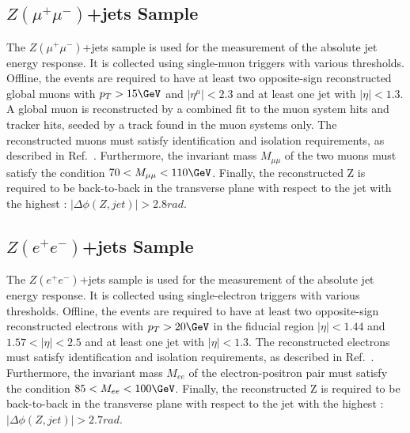 \subsection{$Z(\mu^+\mu^-)$+jets Sample}

The $Z(\mu^+\mu^-)$+jets sample is used for the measurement of the absolute jet energy response. It is collected using single-muon triggers with various \pt thresholds. Offline, the events are required to have at least two opposite-sign reconstructed global muons with $\pt>15\GeV$ and $|\eta^\mu|<2.3$ and at least one jet with $|\eta|<1.3$. A global muon is reconstructed by a combined fit to the muon system hits and tracker hits, seeded by a track found in the muon systems only. The reconstructed muons must satisfy identification and isolation requirements, as described in Ref.~\cite{EWK-10-002}. Furthermore, the invariant mass $M_{\mu\mu}$ of the two muons must satisfy the condition $70<M_{\mu\mu}<110\GeV$. Finally, the reconstructed Z is required to be back-to-back in the transverse plane with respect to the jet with the highest \pt: $|\Delta\phi(Z,jet)|>2.8 rad$. 

\subsection{$Z(e^+e^-)$+jets Sample}

The $Z(e^+e^-)$+jets sample is used for the measurement of the absolute jet energy response. It is collected using single-electron triggers with various \pt thresholds. Offline, the events are required to have at least two opposite-sign reconstructed electrons with $\pt>20\GeV$ in the fiducial region $|\eta|<1.44$ and $1.57<|\eta|<2.5$ and at least one jet with $|\eta|<1.3$. The reconstructed electrons must satisfy identification and isolation requirements, as described in Ref.~\cite{EWK-10-002}. Furthermore, the invariant mass $M_{ee}$ of the electron-positron pair must satisfy the condition $85<M_{ee}<100\GeV$. Finally, the reconstructed Z is required to be back-to-back in the transverse plane with respect to the jet with the highest \pt: $|\Delta\phi(Z,jet)|>2.7 rad$. 






